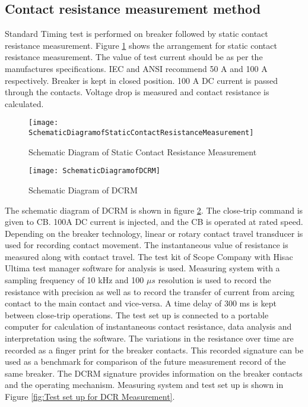 \subsection{Contact resistance measurement method}
Standard Timing test is performed on breaker followed by static contact resistance measurement. Figure \ref{fig:Schematic Diagram of Static Contact Resistance Measurement} shows the arrangement for static contact resistance measurement. The value of test current should be as per the manufactures specifications. IEC and ANSI recommend 50 A and 100 A respectively. Breaker is kept in closed position. 100 A DC current is passed through the contacts. Voltage drop is measured and contact resistance is calculated.

\begin{figure}[!htbp]
    \centering
    \texttt{[image: SchematicDiagramofStaticContactResistanceMeasurement]}
    \caption{Schematic Diagram of Static Contact Resistance Measurement}
    \label{fig:Schematic Diagram of Static Contact Resistance Measurement}
\end{figure}

\begin{figure}[!htbp]
    \centering
    \texttt{[image: SchematicDiagramofDCRM]}
    \caption{Schematic Diagram of DCRM}
    \label{fig:Schematic Diagram of DCRM}
\end{figure}

The schematic diagram of DCRM is shown in figure \ref{fig:Schematic Diagram of DCRM}. The close-trip command is given to CB. 100A DC current is injected, and the CB is operated at rated speed. Depending on the breaker technology, linear or rotary contact travel transducer is used for recording contact movement. The instantaneous value of resistance is measured along with contact travel. The test kit of Scope Company with Hisac Ultima test manager software for analysis is used. Measuring system with a sampling frequency of 10 kHz and 100 $\mu s$ resolution is used to record the resistance with precision as well as to record the transfer of current from arcing contact to the main contact and vice-versa. A time delay of 300 ms is kept between close-trip operations. The test set up is connected to a portable computer for calculation of instantaneous contact resistance, data analysis and interpretation using the software. The variations in the resistance over time are recorded as a finger print for the breaker contacts. This recorded signature can be used as a benchmark for comparison of the future measurement record of the same breaker. The DCRM signature provides information on the breaker contacts and the operating mechanism. Measuring system and test set up is shown in Figure \ref{fig:Test set up for DCR Measurement}.

